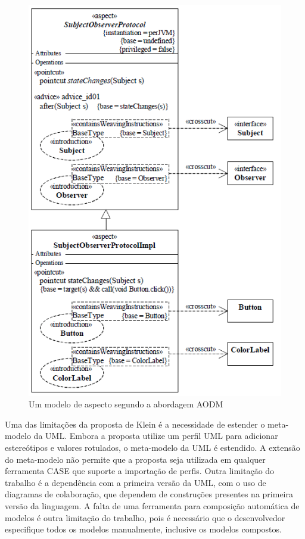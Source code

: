 \begin{figure}
	\centering
	\includegraphics{img/stein_1.png}
	\caption{Um modelo de aspecto segundo a abordagem AODM}\label{fig:stein_1}
\end{figure}

Uma das limitações da proposta de Klein é a necessidade de estender o meta-modelo da UML. Embora a proposta utilize um perfil UML para adicionar estereótipos e valores rotulados, o meta-modelo da
UML é estendido. A extensão do meta-modelo não permite que a proposta seja utilizada em qualquer ferramenta CASE que suporte a importação de perfis.
Outra limitação do trabalho é a dependência com a primeira versão da UML, com o uso de diagramas de colaboração, que dependem de construções presentes
na primeira versão da linguagem. A falta de uma ferramenta para composição automática de modelos é outra limitação do trabalho, pois é necessário que o desenvolvedor
especifique todos os modelos manualmente, inclusive os modelos compostos.

